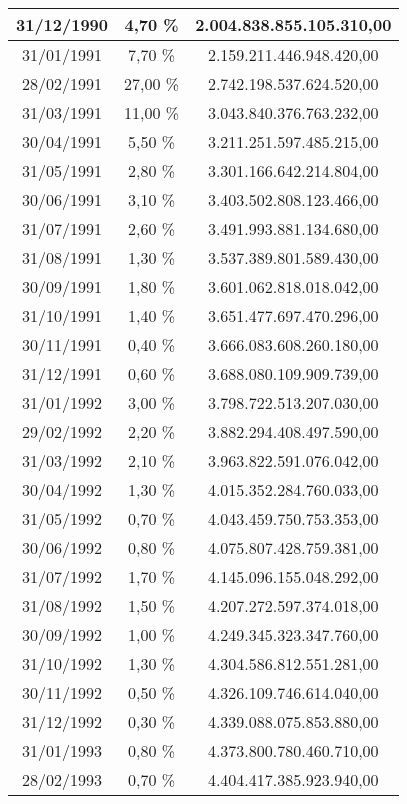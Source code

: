 \begin{center}
\begin{longtable}{|c|c|c|}
31/12/1990 & 4,70 \% & 2.004.838.855.105.310,00  \\ \hline
31/01/1991 & 7,70 \% & 2.159.211.446.948.420,00  \\ \hline
28/02/1991 & 27,00 \% & 2.742.198.537.624.520,00  \\ \hline
31/03/1991 & 11,00 \% & 3.043.840.376.763.232,00  \\ \hline
30/04/1991 & 5,50 \% & 3.211.251.597.485.215,00  \\ \hline
31/05/1991 & 2,80 \% & 3.301.166.642.214.804,00  \\ \hline
30/06/1991 & 3,10 \% & 3.403.502.808.123.466,00  \\ \hline
31/07/1991 & 2,60 \% & 3.491.993.881.134.680,00  \\ \hline
31/08/1991 & 1,30 \% & 3.537.389.801.589.430,00  \\ \hline
30/09/1991 & 1,80 \% & 3.601.062.818.018.042,00  \\ \hline
31/10/1991 & 1,40 \% & 3.651.477.697.470.296,00  \\ \hline
30/11/1991 & 0,40 \% & 3.666.083.608.260.180,00  \\ \hline
31/12/1991 & 0,60 \% & 3.688.080.109.909.739,00  \\ \hline
31/01/1992 & 3,00 \% & 3.798.722.513.207.030,00  \\ \hline
29/02/1992 & 2,20 \% & 3.882.294.408.497.590,00  \\ \hline
31/03/1992 & 2,10 \% & 3.963.822.591.076.042,00  \\ \hline
30/04/1992 & 1,30 \% & 4.015.352.284.760.033,00  \\ \hline
31/05/1992 & 0,70 \% & 4.043.459.750.753.353,00  \\ \hline
30/06/1992 & 0,80 \% & 4.075.807.428.759.381,00  \\ \hline
31/07/1992 & 1,70 \% & 4.145.096.155.048.292,00  \\ \hline
31/08/1992 & 1,50 \% & 4.207.272.597.374.018,00  \\ \hline
30/09/1992 & 1,00 \% & 4.249.345.323.347.760,00  \\ \hline
31/10/1992 & 1,30 \% & 4.304.586.812.551.281,00  \\ \hline
30/11/1992 & 0,50 \% & 4.326.109.746.614.040,00  \\ \hline
31/12/1992 & 0,30 \% & 4.339.088.075.853.880,00  \\ \hline
31/01/1993 & 0,80 \% & 4.373.800.780.460.710,00  \\ \hline
28/02/1993 & 0,70 \% & 4.404.417.385.923.940,00  \\ \hline

\end{longtable}
\end{center}
